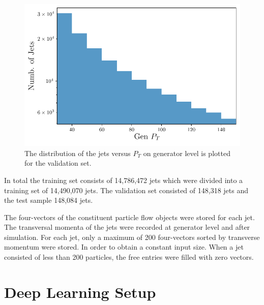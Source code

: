 \documentclass[12pt, a4paper]{thesis}
\begin{document}
\begin{figure}[H]
  \centering
  \includegraphics[width=.9\linewidth]{../images/jet_distri.pdf}
  \caption{ The distribution of the jets versus \(P_T\) on generator
    level is plotted for the validation set.}
  \label{jet_distri}
\end{figure}

In total the training set consists of 14,786,472 jets which were
divided into a training set of 14,490,070 jets. The validation set
consisted of 148,318 jets and the test sample 148,084 jets.

The four-vectors of the constituent particle flow objects were stored
for each jet. The transversal momenta of the jets were recorded at
generator level and after simulation. For each jet, only a maximum of
200 four-vectors sorted by transverse momentum were stored. In order
to obtain a constant input size. When a jet consisted of less than 200
particles, the free entries were filled with zero vectors.

\section{Deep Learning Setup}
\label{sec:orgf3b24cc}
\end{document}
